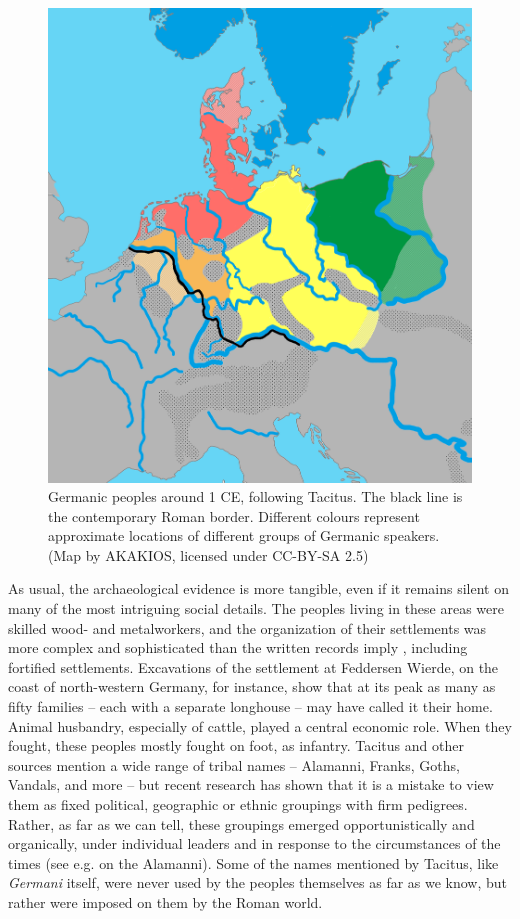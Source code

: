\begin{figure}[ht]
        \includegraphics[scale=0.2]{chapters/img/germanic-varieties-tacitus.png}
    \caption{Germanic peoples around 1 CE, following Tacitus. The black line is the contemporary Roman border. Different colours represent approximate locations of different groups of Germanic speakers. (Map by AKAKIOS, licensed under CC-BY-SA 2.5)}
    \label{fig:Tacitus}
\end{figure}

As usual, the archaeological evidence is more tangible, even if it remains silent on many of the most intriguing social details. The peoples living in these areas were skilled wood- and metalworkers, and the organization of their settlements was more complex and sophisticated than the written records imply \citep{Todd2005}, including fortified settlements. Excavations of the settlement at Feddersen Wierde, on the coast of north-western Germany, for instance, show that at its peak as many as fifty families -- each with a separate longhouse -- may have called it their home. Animal husbandry, especially of cattle, played a central economic role. When they fought, these peoples mostly fought on foot, as infantry. Tacitus and other sources mention a wide range of tribal names -- Alamanni, Franks, Goths, Vandals, and more -- but recent research has shown that it is a mistake to view them as fixed political, geographic or ethnic groupings with firm pedigrees. Rather, as far as we can tell, these groupings emerged opportunistically and organically, under individual leaders and in response to the circumstances of the times (see e.g. \citealp{Drinkwater2007} on the Alamanni). Some of the names mentioned by Tacitus, like \emph{Germani} itself, were never used by the peoples themselves as far as we know, but rather were imposed on them by the Roman world.

